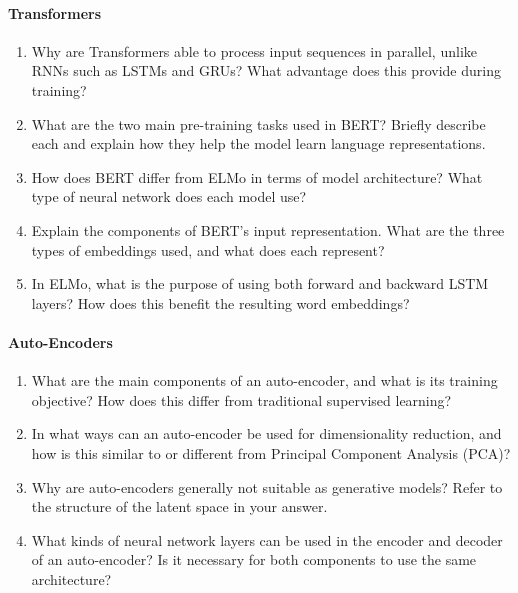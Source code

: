 \paragraph*{Transformers}

\begin{enumerate}
    \item Why are Transformers able to process input sequences in parallel, unlike RNNs such as LSTMs and GRUs? What advantage does this provide during training?

    \item What are the two main pre-training tasks used in BERT? Briefly describe each and explain how they help the model learn language representations.

    \item How does BERT differ from ELMo in terms of model architecture? What type of neural network does each model use?

    \item Explain the components of BERT's input representation. What are the three types of embeddings used, and what does each represent?

    \item In ELMo, what is the purpose of using both forward and backward LSTM layers? How does this benefit the resulting word embeddings?
\end{enumerate}

\paragraph*{Auto-Encoders}
\begin{enumerate}
   \item What are the main components of an auto-encoder, and what is its training objective? How does this differ from traditional supervised learning?

   \item In what ways can an auto-encoder be used for dimensionality reduction, and how is this similar to or different from Principal Component Analysis (PCA)?

   \item Why are auto-encoders generally not suitable as generative models? Refer to the structure of the latent space in your answer.

   \item What kinds of neural network layers can be used in the encoder and decoder of an auto-encoder? Is it necessary for both components to use the same architecture?
\end{enumerate}

